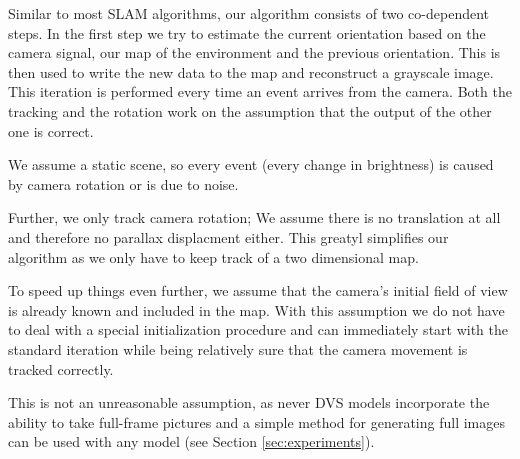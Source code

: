 Similar to most SLAM algorithms, our algorithm consists of two co-dependent
steps. In the first step we try to estimate the current orientation based on
the camera signal, our map of the environment and the previous orientation.
This is then used to write the new data to the map and reconstruct a grayscale
image. This iteration is performed every time an event arrives from the camera.
Both the tracking and the rotation work on the assumption that the output  of
the other one is correct.

We assume a static scene, so every event (every change in brightness) is caused
by camera rotation or is due to noise.

Further, we only track camera rotation; We assume there is no translation at
all and therefore no parallax displacment either. This greatyl simplifies our
algorithm as we only have to keep track of a two dimensional map.

To speed up things even further, we assume that the camera's initial field
of view is already known and included in the map. With this assumption we do
not have to deal with a special initialization procedure and can immediately
start with the standard iteration while being relatively sure that the camera
movement is tracked correctly.

This is not an unreasonable assumption, as never DVS models incorporate the
ability to take full-frame pictures and a simple method for generating full
images can be used with any model (see Section \ref{sec:experiments}).